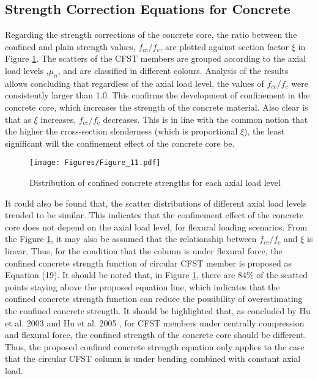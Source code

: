\documentclass[12pt,a4]{article}
\begin{document}
	\subsection{Strength Correction Equations for Concrete}
	Regarding the strength corrections of the concrete core, the ratio between the confined and plain strength values, $f_{cc}/f_c$, are plotted against section factor $ξ$ in Figure \ref{fig-10}. The scatters of the CFST members are grouped according to the axial load levels ,$μ_n$, and are classified in different colours. Analysis of the results allows concluding that regardless of the axial load level, the values of $f_{cc}/f_c$ were consistently larger than 1.0. This confirms the development of confinement in the concrete core, which increases the strength of the concrete material. Also clear is that as $ξ$ increases, $f_{cc}/f_c$ decreases. This is in line with the common notion that the higher the cross-section slenderness (which is proportional $ξ$), the least significant will the confinement effect of the concrete core be.
	\par
	\begin{figure}[h]
		\centering
		\texttt{[image: Figures/Figure\_11.pdf]}
		\caption{Distribution of confined concrete strengths for each axial load level}
		\label{fig-10}
	\end{figure}
	\par
	It could also be found that, the scatter distributions of different axial load levels trended to be similar. This indicates that the confinement effect of the concrete core does not depend on the axial load level, for flexural loading scenarios. From the Figure \ref{fig-10}, it may also be assumed that the relationship between $f_{cc}/f_c$ and $ξ$ is linear. Thus, for the condition that the column is under flexural force, the confined concrete strength function of circular CFST member is proposed as Equation (19). It should be noted that, in Figure \ref{fig-10}, there are 84\% of the scatted points  staying above the proposed equation line, which indicates that the confined concrete strength function can reduce the possibility of overestimating the confined concrete strength. It should be highlighted that, as concluded by Hu et al. 2003 \cite{RN1} and Hu et al. 2005 \cite{RN29}, for CFST members under centrally compression and flexural force, the confined strength of the concrete core should be different. Thus, the proposed confined concrete strength equation only applies to the case that the circular CFST column is under bending combined with constant axial load.
\end{document}
